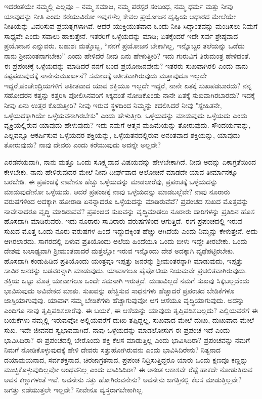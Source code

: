ಇದರಂತೆಯೇ ನಮ್ಮಲ್ಲಿ ಎಲ್ಲವೂ – ನಮ್ಮ ಸಮಾಜ, ನಮ್ಮ ಪರಸ್ಪರ ಸಂಬಂಧ, ನಮ್ಮ ಧರ್ಮ ಮತ್ತು ನೀವು ಯಾವುದನ್ನು ನೀತಿ ಎಂದು ಕರೆಯುವಿರೋ ಇವುಗಳೆಲ್ಲ ಕೇವಲ ಪ್ರಯೋಜನ ದೃಷ್ಟಿಯ ಆಧಾರದ ಮೇಲೆಯೇ ನೀತಿಯನ್ನು ವಿವರಿಸುವ ಪ್ರಯತ್ನಗಳಾಗಿವೆ. ಆದರೆ ಯುಕ್ತಿಯುತವಾದ ಒಂದು ನೀತಿ ಸಿದ್ಧಾಂತವನ್ನು ಮಂಡಿಸಲು ನಿಮಗೆ ಸಾಧ್ಯವೇ ಎಂದು ಸವಾಲು ಹಾಕುತ್ತೇನೆ. ಇತರರಿಗೆ ಒಳ್ಳೆಯದನ್ನು ಮಾಡಿ; ಏತಕ್ಕೆಂದರೆ ಇದೇ ಸರ್ವ ಶ್ರೇಷ್ಠವಾದ ಪ್ರಯೋಜನ ಎನ್ನುವರು. ಬಹುಶಃ ಮತ್ತೊಬ್ಬ, “ನನಗೆ ಪ್ರಯೋಜನ ಬೇಕಾಗಿಲ್ಲ, ಇನ್ನೊಬ್ಬರ ತಲೆಯನ್ನು ಒಡೆದು ನಾನು ಶ‍್ರೀಮಂತ\-ನಾಗಬೇಕು'' ಎಂದು ಹೇಳಿದರೆ ನೀವು ಏನು ಹೇಳುತ್ತೀರಿ? ಇದು ಗುರುವಿಗೆ ತಿರುಮಂತ್ರ ಹೇಳಿದಂತೆ. ಈ ಪ್ರಪಂಚಕ್ಕೆ ಒಳ್ಳೆಯದನ್ನು ಮಾಡಿದರೆ ನನಗೆ ಬಂದ ಪ್ರಯೋಜನವೇನು? ಇತರರು ಸುಖವಾಗಿರಲಿ ಎಂದು ನಾನು ಕಷ್ಟಪಡುವುದಕ್ಕೆ ನಾನೇನು\break ಮೂರ್ಖನೆ? ಸಮಾಜಕ್ಕೆ ಅತೀತವಾಗಿರುವುದು ಮತ್ತಾವುದೂ ಇಲ್ಲದೇ ಇದ್ದರೆ,\break ಪಂಚೇಂದ್ರಿಯಗಳಿಗೆ ಅತೀತವಾದ ಯಾವ ಶಕ್ತಿಯೂ ಇಲ್ಲದೇ ಇದ್ದರೆ, ನಾನೇ ಏತಕ್ಕೆ ಸುಖಪಡಬಾರದು? ನನ್ನ ಸಹೋದರನ ಕತ್ತನ್ನು ಕತ್ತರಿಸಿ ಪೋಲಿಸಿನವರಿಗೆ ಸಿಕ್ಕದಂತೆ ನೋಡಿಕೊಂಡು ನಾನೇ ಏತಕ್ಕೆ ಸುಖವಾಗಿರಬಾರದು? ಇದಕ್ಕೆ ನೀವು ಏನು ಉತ್ತರ ಕೊಡುತ್ತೀರಿ? ನೀವು ಇರುವ ಸ್ಥಳದಿಂದ ನಿಮ್ಮನ್ನು ಕದಲಿಸಿದರೆ ನೀವು "ಸ್ನೇಹಿತನೇ, ಒಳ್ಳೆಯದಕ್ಕಾಗಿಯೇ ಒಳ್ಳೆಯವನಾಗಿರಬೇಕು" ಎಂದು ಹೇಳುತ್ತೀರಿ. ಒಳ್ಳೆಯದನ್ನು ಮಾಡುವುದು ಒಳ್ಳೆಯದು ಎಂದು ವ್ಯಕ್ತಿಯಲ್ಲಿರುವ ಯಾವುದು ಹೇಳುವುದು? ಇದು ನಮಗೆ ಆತ್ಮನ ಮಹಿಮೆಯನ್ನು ತೋರುವುದು. ಸೌಂದರ್ಯವನ್ನು, ಎಲ್ಲವನ್ನೂ ಆಕರ್ಷಿಸುವ ಒಳ್ಳೆಯದರ ಶಕ್ತಿಯನ್ನು, ಒಳ್ಳೆಯತನದಲ್ಲಿರುವ ಅನಂತವಾದ ಶಕ್ತಿಯನ್ನು, ಯಾವುದು ತೋರುವುದು? ನಾವು ದೇವರು ಎಂದು ಕರೆಯುವುದು ಅದನ್ನೇ ಅಲ್ಲವೇ?

ಎರಡನೆಯದಾಗಿ, ನಾನು ಮತ್ತೂ ಒಂದು ಸೂಕ್ಷ್ಮವಾದ ವಿಷಯವನ್ನು ಹೇಳಬೇಕಾಗಿದೆ. ನೀವು ಅದನ್ನು ಏಕಾಗ್ರತೆಯಿಂದ ಕೇಳಬೇಕು. ನಾನು ಹೇಳಿರುವುದರ ಮೇಲೆ ನೀವು ದೀರ್ಘವಾದ ಆಲೋಚನೆ ಮಾಡದೇ ಯಾವ ತೀರ್ಮಾನಕ್ಕೂ ಬರಬೇಡಿ. ಈ ಪ್ರಪಂಚಕ್ಕೆ ನಾವೇನೂ ಹೆಚ್ಚು ಒಳ್ಳೆಯದನ್ನು ಮಾಡಲಾರೆವು, ಪ್ರಪಂಚಕ್ಕೆ ಒಳ್ಳೆಯದನ್ನು ಮಾಡುವುದೇನೋ ಒಳ್ಳೆಯದು. ಆದರೆ ಪ್ರಪಂಚಕ್ಕೆ ನಾವು ಒಳ್ಳೆಯದನ್ನು ಮಾಡಬಲ್ಲೆವೇ? ನಾವು ನೂರಾರು ವರುಷಗಳಿಂದ ಅದಕ್ಕಾಗಿ ಹೋರಾಡಿ ಏನನ್ನಾದರೂ ಒಳ್ಳೆಯದನ್ನು ಮಾಡಿರುವೆವೆ? ಪ್ರಪಂಚದ ಸುಖದ ಮೊತ್ತವನ್ನು ನಾವೇನಾದರೂ ವೃದ್ಧಿ ಮಾಡಿರುವವೆ? ಪ್ರಪಂಚದ ಸುಖವನ್ನು ವೃದ್ಧಿಮಾಡಲು ನೂರಾರು ದಾರಿಗಳನ್ನು ಪ್ರತಿದಿನ ಹೊಸ ಹೊಸದಾಗಿ ಮಾಡಿರುವರು. ಇದು ನೂರಾರು ಸಾವಿರಾರು ವರುಷಗಳಿಂದ ಆಗುತ್ತಿದೆ. ಈಗ ಪ್ರಪಂಚದಲ್ಲಿ ಇರುವ ಸುಖದ ಮೊತ್ತ ಒಂದು ನೂರು ವರುಷಗಳ ಹಿಂದೆ ಇದ್ದುದಕ್ಕಿಂತ ಹೆಚ್ಚು ಆಗಿದೆಯೆ ಎಂದು ನಿಮ್ಮನ್ನು ಕೇಳುತ್ತೇನೆ. ಅದು ಆಗಿರಲಾರದು. ಸಾಗರದಲ್ಲಿ ಏಳುವ ಪ್ರತಿಯೊಂದು ಅಲೆಯ ಹಿಂದೆಯೂ ಒಂದು ಬೀಳು ಇದ್ದೇ ತೀರಬೇಕು. ಒಂದು ದೇಶವು ಬಲಾಢ್ಯವಾಗಿ ಶ‍್ರೀಮಂತವಾದರೆ ಮತ್ತೆಲ್ಲೋ ಇರುವ ಇನ್ನೊಂದು ದೇಶ ಅದಕ್ಕಾಗಿ ವ್ಯಥೆಪಟ್ಟಿರಬೇಕು. ಹೊಸದಾಗಿ ಕಂಡುಹಿಡಿದ ಪ್ರತಿಯೊಂದು ಯಂತ್ರವೂ ಇಪ್ಪತ್ತು ಜನರನ್ನು ಶ‍್ರೀಮಂತರನ್ನಾಗಿ ಮಾಡುವುದು, ಇಪ್ಪತ್ತು ಸಾವಿರ ಜನರನ್ನು ಬಡವರನ್ನಾಗಿ ಮಾಡುವುದು. ಯಾವಾಗಲೂ ಪೈಪೋಟಿಯ ನಿಯಮವೇ ಪ್ರಚಲಿತವಾಗಿರುವುದು. ಶಕ್ತಿಯ ಒಟ್ಟು ಮೊತ್ತ ಯಾವಾಗಲೂ ಒಂದೇ ಸಮನಾಗಿ ಇರುತ್ತದೆ. ದುಃಖವಿಲ್ಲದೆ ನಮಗೆ ಸುಖವು ಸಿಕ್ಕಬಲ್ಲದೆಂದು ಭಾವಿಸುವುದು ಅವಿವೇಕದ ಮಾತು. ಸುಖವನ್ನು ಹೆಚ್ಚಿಸುವ ಸಾಧನಗಳು ಹೆಚ್ಚಾದರೆ ಪ್ರಪಂಚದ ಬೇಡಿಕೆಗಳೂ ಜಾಸ್ತಿಯಾಗುವುವು. ಯಾವಾಗ ನಮ್ಮ ಬೇಡಿಕೆಗಳು ಹೆಚ್ಚಾಗುವುವೋ ಆಗ ಆಸೆಯೂ ವೃದ್ಧಿಯಾಗುವುದು. ಅದನ್ನು ಎಂದಿಗೂ ನಾವು ತೃಪ್ತಿಪಡಿಸಲಾರೆವು. ಈ ಬಯಕೆ, ಈ ಆಸೆಯನ್ನು ಯಾವುದು ತೃಪ್ತಿಪಡಿಸಬಲ್ಲದು? ಎಲ್ಲಿಯವರೆಗೆ ಈ ಬಯಕೆಗಳು ನಮ್ಮಲ್ಲಿ ಇರುವುವೋ ಅಲ್ಲಿಯವರೆಗೆ ದುಃಖ ತಪ್ಪಿದ್ದಲ್ಲ. ಸುಖವಾದ ಮೇಲೆ ದುಃಖ, ದುಃಖವಾದ ಮೇಲೆ ಸುಖ. ಇದೇ ಜೀವನದ ಸ್ವಭಾವವಾಗಿದೆ. ನಾವು ಒಳ್ಳೆಯದನ್ನು ಮಾಡಲೋಸುಗ ಈ ಪ್ರಪಂಚ ಇದೆ ಎಂದು ಭಾವಿಸಿದಿರಾ? ಈ ಪ್ರಪಂಚದಲ್ಲಿ ಬೇರೊಂದು ಶಕ್ತಿ ಕೆಲಸ ಮಾಡುತ್ತಿಲ್ಲ ಎಂದು ಭಾವಿಸಿದಿರಾ? ಪ್ರಪಂಚವನ್ನು ನಮಗೆ ನಿಮಗೆ ನೋಡಿಕೊಳ್ಳುವುದಕ್ಕೆ ಹೇಳಿ ದೇವರು ಸತ್ತುಹೋಗಿರುವನು ಎಂದು ಭಾವಿಸಿದಿರೇನು? ನಿತ್ಯನಾದ ದಯಾಮಯನಾದ, ಸರ್ವಶಕ್ತನಾದ, ಚಿರಜಾಗ್ರತನಾದ, ಪ್ರಪಂಚ ನಿದ್ರಿಸುತ್ತಿದ್ದರೂ ಯಾರು ಒಂದು ಕ್ಷಣವೂ ಕಣ್ಣನ್ನು ಮುಚ್ಚಿಕೊಳ್ಳುವುದಿಲ್ಲವೋ ಅಂಥವನಿಲ್ಲ ಎಂದು ಭಾವಿಸಿದಿರಾ? ಈ ಅನಂತ ಆಕಾಶವೇ ರೆಪ್ಪೆ ಹಾಕದೇ ನೋಡುತ್ತಿರುವ ಅವನ ಕಣ್ಣುಗಳಂತೆ ಇವೆ. ಅವನೇನು ಸತ್ತು ಹೋಗಿರುವನೇನು? ಅವನೇನು ಜಗತ್ತಿನಲ್ಲಿ ಕೆಲಸ ಮಾಡುತ್ತಿಲ್ಲವೇ? ಜಗತ್ತು ನಡೆಯುತ್ತಲೇ ಇಲ್ಲವೇ? ನೀವೇನೂ ವ್ಯಸ್ತರಾಗಬೇಕಾಗಿಲ್ಲ.

